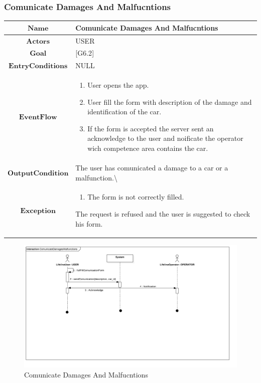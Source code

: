 \subsubsection{Comunicate Damages And Malfucntions}

\begin{tabular}{|c|>{\raggedright}p{10cm}|}
\hline 
$\boldsymbol{\mathbf{Name}}$ & Comunicate Damages And Malfucntions\tabularnewline
\hline 
$\mathbf{Actors}$ & USER \tabularnewline
\hline 
$\mathbf{Goal}$ & {[}G6.2{]}\tabularnewline
\hline 
$\mathbf{EntryConditions}$ & NULL\tabularnewline
\hline 
$\mathbf{EventFlow}$ & \begin{enumerate}
\item User opens the app.
\item User fill the form with description of the damage and identification
of the car.
\item If the form is accepted the server sent an acknowledge to the user
and noificate the operator wich competence area contains the car. 
\end{enumerate}
\tabularnewline
\hline 
$\mathbf{OutputCondition}$ & The user has comunicated a damage to a car or a malfunction.\textbackslash{}\tabularnewline
\hline 
$\mathbf{Exception}$ & \begin{enumerate}
\item The form is not correctly filled.
\end{enumerate}
The request is refused and the user is suggested to check his form.\tabularnewline
\hline 
\end{tabular}
\begin{center}
\begin{figure}[H]
\includegraphics[scale=0.3]{UML/png/ComunicateDamagesMalfunctions}

\caption{Comunicate Damages And Malfucntions}
\end{figure}
\par\end{center}
